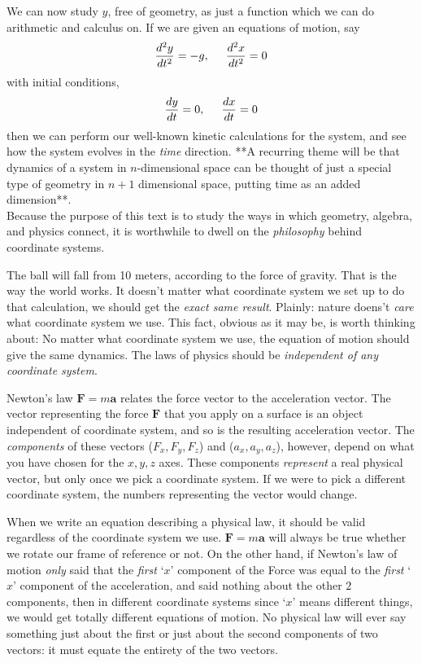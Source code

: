 \documentclass[../master.tex]{subfiles}
\begin{document}
	
	We can now study $y$, free of geometry, as just a function which we can do arithmetic and calculus on. If we are given an equations of motion, say 
	\begin{equation*}
		\frac{d^2y}{dt^2} = -g, \hspace{5mm} \frac{d^2x}{dt^2} = 0
	\end{equation*} 
	with initial conditions,
	\begin{equation*}
		\frac{dy}{dt}=0, \hspace{5mm} \frac{dx}{dt}=0
	\end{equation*}
	 then we can perform our well-known kinetic calculations for the system, and see how the system evolves in the \emph{time} direction. **A recurring theme will be that dynamics of a system in $n$-dimensional space can be thought of just a special type of geometry in $n+1$ dimensional space, putting time as an added dimension**.\\
	
	Because the purpose of this text is to study the ways in which geometry, algebra, and physics connect, it is worthwhile to dwell on the \emph{philosophy} behind coordinate systems.
	
	The ball will fall from 10 meters, according to the force of gravity. That is the way the world works. It doesn't matter what coordinate system we set up to do that calculation, we should get the \emph{exact same result}. Plainly: nature doens't \emph{care} what coordinate system we use. This fact, obvious as it may be, is worth thinking about: No matter what coordinate system we use, the equation of motion should give the same dynamics. The laws of physics should be \emph{independent of any coordinate system}.
	
	Newton's law $\mathbf F = m \mathbf a$ relates the force vector to the acceleration vector. The vector representing the force $\mathbf F$ that you apply on a surface is an object independent of coordinate system, and so is the resulting acceleration vector. The \emph{components} of these vectors ($F_x, F_y, F_z$) and ($a_x, a_y, a_z$), however, depend on what you have chosen for the $x,y,z$ axes. These components \emph{represent} a real physical vector, but only once we pick a coordinate system. If we were to pick a different coordinate system, the numbers representing the vector would change. 
	
	When we write an equation describing a physical law, it should be valid regardless of the coordinate system we use. $\mathbf F = m \mathbf a$ will always be true whether we rotate our frame of reference or not. On the other hand, if Newton's law of motion \emph{only} said that the \emph{first} `$x$' component of the Force was equal to the \emph{first} `$x$' component of the acceleration, and said nothing about the other $2$ components, then in different coordinate systems since `$x$' means different things, we would get totally different equations of motion. No physical law will ever say something just about the first or just about the second components of two vectors: it must equate the entirety of the two vectors. 
	
\end{document}
